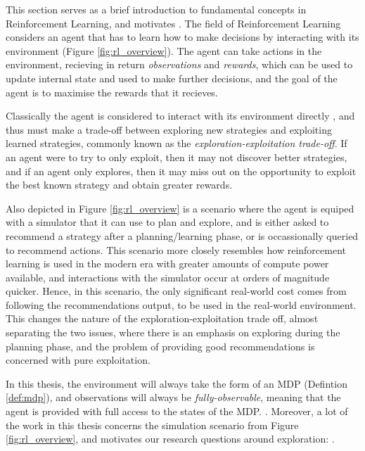 
    This section serves as a brief introduction to fundamental concepts in Reinforcement Learning, and motivates . The field of Reinforcement Learning considers an agent that has to learn how to make decisions by interacting with its environment (Figure \ref{fig:rl_overview}). The agent can take actions in the environment, recieving in return \textit{observations} and \textit{rewards}, which can be used to update internal state and used to make further decisions, and the goal of the agent is to maximise the rewards that it recieves.

    Classically the agent is considered to interact with its environment directly , and thus must make a trade-off between exploring new strategies and exploiting learned strategies, commonly known as the \textit{exploration-exploitation trade-off}. If an agent were to try to only exploit, then it may not discover better strategies, and if an agent only explores, then it may miss out on the opportunity to exploit the best known strategy and obtain greater rewards.

    Also depicted in Figure \ref{fig:rl_overview} is a scenario where the agent is equiped with a simulator that it can use to plan and explore, and is either asked to recommend a strategy after a planning/learning phase, or is occassionally queried to recommend actions. This scenario more closely resembles how reinforcement learning is used in the modern era with greater amounts of compute power available, and interactions with the simulator occur at orders of magnitude quicker. Hence, in this scenario, the only significant real-world cost comes from following the recommendations output, to be used in the real-world environment. This changes the nature of the exploration-exploitation trade off, almost separating the two issues, where there is an emphasis on exploring during the planning phase, and the problem of providing good recommendations is concerned with pure exploitation. 

    In this thesis, the environment will always take the form of an MDP (Defintion \ref{def:mdp}), and observations will always be \textit{fully-observable}, meaning that the agent is provided with full access to the states of the MDP. . Moreover, a lot of the work in this thesis concerns the simulation scenario from Figure \ref{fig:rl_overview}, and motivates our research questions around exploration: \exploreq.

